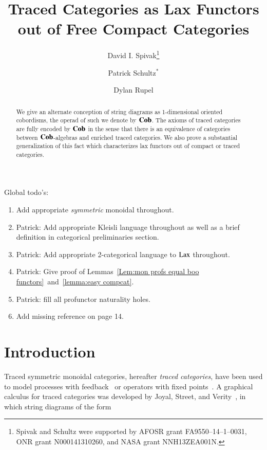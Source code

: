 \documentclass[12pt,oneside,article,draft]{memoir}
\title{Traced Categories as Lax Functors out of Free Compact Categories}
\author{
David I. Spivak\thanks{Spivak and Schultz were supported by AFOSR grant FA9550--14--1--0031, ONR grant N000141310260, and NASA grant NNH13ZEA001N.}
 \and 
 Patrick Schultz${}^*$%
 \and
 Dylan Rupel
 }
\begin{document}
\tightlists
\firmlists

\maketitle
\begin{abstract}
We give an alternate conception of string diagrams as 1-dimensional oriented cobordisms, the operad of such we denote by $\mathbf{Cob}$. The axioms of traced categories are fully encoded by $\mathbf{Cob}$ in the sense that there is an equivalence of categories between $\mathbf{Cob}$-algebras and enriched traced categories. We also prove a substantial generalization of this fact which characterizes lax functors out of compact or traced categories.
\end{abstract}
Global todo's:
\begin{enumerate}
\item Add appropriate {\em symmetric\/} monoidal throughout.
\item Patrick: Add appropriate Kleisli language throughout as well as a brief definition in categorical preliminaries section.
\item Patrick: Add appropriate 2-categorical language to $\operatorname{Lax}$ throughout.
\item Patrick: Give proof of Lemmas~\ref{Lem:mon profs equal boo functors}~and~\ref{lemma:easy compcat}.
\item Patrick: fill all profunctor naturality holes.
\item Add missing reference \cite{Abramsky?} on page 14.
\end{enumerate}


\setcounter{tocdepth}{1}
\tableofcontents*


\chapter{Introduction}

Traced symmetric monoidal categories, hereafter \emph{traced categories}, have been used to model processes with feedback~\cite{Abramsky1}  or operators with fixed points~\cite{PontoShulman}. A graphical calculus for traced categories was developed by Joyal, Street, and Verity~\cite{JoyalStreetVerity}, in which string diagrams of the form
\end{document}
